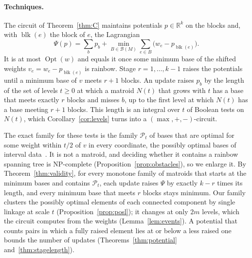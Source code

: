 \documentclass[runningheads,envcountsame]{llncs}
\newcommand{\R}{\mathbb R}
\newcommand{\Opt}{\operatorname{Opt}}
\newcommand{\blk}{\operatorname{blk}}
\newcommand{\Bases}{\mathcal B}
\newcommand{\Pos}{\mathcal P}
\begin{document}
\paragraph{Techniques.}
The circuit of Theorem~\ref{thm:C} maintains potentials $p\in\R^{k}$ on the
blocks and, with $\blk(e)$ the block of $e$, the Lagrangian
\[
  \Psi(p)=\sum_{b}p_b+\min_{B\in\Bases(M)}\sum_{e\in B}\bigl(w_e-p_{\blk(e)}\bigr).
\]
It is at most $\Opt(w)$ and equals it once some minimum base of the shifted
weights $v_e=w_e-p_{\blk(e)}$ is rainbow.  Stage $r=1,\ldots,k-1$ raises the potentials
until a minimum base of $v$ meets $r+1$ blocks.  An update raises $p_b$ by
the length of the set of levels $t\ge0$ at which a matroid $N(t)$ that grows with $t$
has a base that meets exactly $r$ blocks and misses $b$, up to the first level at which $N(t)$
has a base meeting $r+1$ blocks.  This length is an integral over $t$ of
Boolean tests on $N(t)$, which Corollary~\ref{cor:levels} turns into a
$(\max,+,-)$-circuit.

The exact family for these tests is the family $\Pos_t$ of bases that are optimal for
some weight within $t/2$ of $v$ in every coordinate, the possibly optimal bases
of interval data~\cite{kasperski08}.  It is not a matroid, and deciding whether
it contains a rainbow spanning tree is NP-complete
(Proposition~\ref{prop:obstacles}), so we enlarge it.  By
Theorem~\ref{thm:validity}, for every monotone family of matroids that starts at
the minimum bases and contains $\Pos_t$, each update raises $\Psi$ by exactly
$k-r$ times its length, and every minimum base that meets $r$ blocks stays
minimum.  Our family clusters the possibly optimal elements of each connected
component by single linkage at scale $t$ (Proposition~\ref{prop:posl}); it
changes at only $2m$ levels, which the circuit computes from the weights
(Lemma~\ref{lem:events}).  A potential that
counts pairs in which a fully raised element lies at or below a less raised one
bounds the number of updates
(Theorems~\ref{thm:potential} and~\ref{thm:stagelength}).
\end{document}
